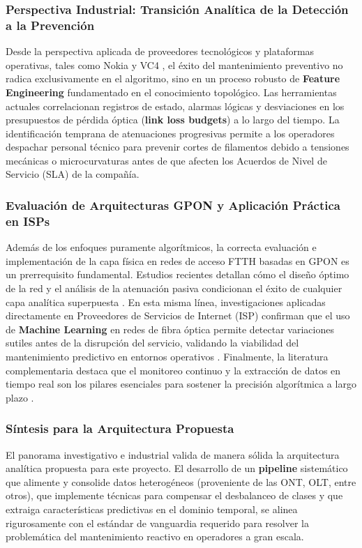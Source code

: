 \documentclass[12pt,a4paper]{article}
\begin{document}
\subsubsection{Perspectiva Industrial: Transición Analítica de la Detección a la Prevención}
Desde la perspectiva aplicada de proveedores tecnológicos y plataformas operativas, tales como Nokia \cite{nokia_predictive} y VC4 \cite{vc4_predictive}, el éxito del mantenimiento preventivo no radica exclusivamente en el algoritmo, sino en un proceso robusto de \textbf{Feature Engineering} fundamentado en el conocimiento topológico.
Las herramientas actuales correlacionan registros de estado, alarmas lógicas y desviaciones en los presupuestos de pérdida óptica (\textbf{link loss budgets}) a lo largo del tiempo. La identificación temprana de atenuaciones progresivas permite a los operadores despachar personal técnico para prevenir cortes de filamentos debido a tensiones mecánicas o microcurvaturas antes de que afecten los Acuerdos de Nivel de Servicio (SLA) de la compañía.

\subsubsection{Evaluación de Arquitecturas GPON y Aplicación Práctica en ISPs}
Además de los enfoques puramente algorítmicos, la correcta evaluación e implementación de la capa física en redes de acceso FTTH basadas en GPON es un prerrequisito fundamental. Estudios recientes detallan cómo el diseño óptimo de la red y el análisis de la atenuación pasiva condicionan el éxito de cualquier capa analítica superpuesta \cite{ftth_gpon_design}. En esta misma línea, investigaciones aplicadas directamente en Proveedores de Servicios de Internet (ISP) confirman que el uso de \textbf{Machine Learning} en redes de fibra óptica permite detectar variaciones sutiles antes de la disrupción del 
servicio, validando la viabilidad del mantenimiento predictivo en entornos operativos \cite{isp_predictive}. Finalmente, la literatura complementaria destaca que el monitoreo continuo y la extracción de datos en tiempo real son los pilares esenciales para sostener la precisión algorítmica a largo plazo \cite{optical_monitoring}.

\subsubsection{Síntesis para la Arquitectura Propuesta}
El panorama investigativo e industrial valida de manera sólida la arquitectura analítica propuesta para este proyecto. El desarrollo de un \textbf{pipeline} sistemático que alimente y consolide datos heterogéneos (proveniente de las ONT, OLT, entre otros), que implemente técnicas para 
compensar el desbalanceo de clases y que extraiga características predictivas en el dominio temporal, se alinea rigurosamente con el estándar de vanguardia requerido para resolver la problemática del mantenimiento reactivo en operadores a gran escala.
\end{document}
